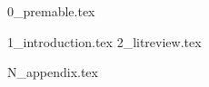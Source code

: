 \documentclass[ %
                    author={Oliver Ryan-George},
                supervisor={Dr. Miranda Mowbray},
                    degree={BSc},
                     title={Natural Language Processing in the Law Domain},
                  subtitle={},
                      year={2019} ]{resources/dissertation}
\begin{document}

\maketitle


\frontmatter


\makedecl



\newpage
{0_premable.tex}



\mainmatter
{1_introduction.tex}
{2_litreview.tex}

\backmatter
\begingroup
    \renewcommand\bibname{References \vspace*{-10mm}}
    \scriptsize
    \setlength\bibitemsep{5pt}
    \printbibliography
\endgroup
{N_appendix.tex}
\end{document}
